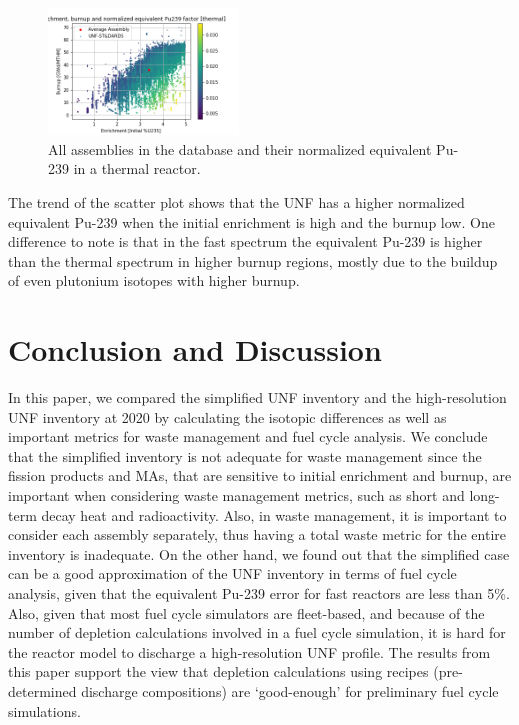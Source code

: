 \documentclass{anstrans}
\begin{document}
\begin{figure}
    \centering
    \includegraphics[width=0.45\textwidth]{./images/thermal_all.png}
    \caption{All assemblies in the database and their normalized equivalent Pu-239 in a thermal reactor.}
    \label{fig:thermal_all}
\end{figure}

The trend of the scatter plot shows that the \gls{UNF}
has a higher normalized equivalent Pu-239 when the
initial enrichment is high and the burnup low. One difference
to note is that in the fast spectrum the equivalent Pu-239
is higher than the thermal spectrum in higher burnup regions,
mostly due to the buildup of even plutonium isotopes with
higher burnup.

\section{Conclusion and Discussion}
In this paper, we compared the simplified \gls{UNF}
inventory and the high-resolution \gls{UNF} inventory
at 2020 by calculating the isotopic differences as well
as important metrics for waste management and fuel cycle analysis.
We conclude that the simplified inventory is not adequate for waste
management since the fission products and \glspl{MA}, that are sensitive to 
initial enrichment and burnup, are important when considering
waste management metrics, such as short and long-term decay heat and radioactivity.
Also, in waste management, it is important to consider each assembly separately,
thus having a total waste metric for the entire inventory is inadequate.
On the other hand, we found out that the simplified case can be a good
approximation of the \gls{UNF} inventory in terms of fuel cycle analysis,
given that the equivalent Pu-239 error for fast reactors are less than
5\%. Also, given that most fuel cycle simulators are fleet-based, and
because of the number of depletion calculations involved in a fuel cycle
simulation, it is hard for the reactor model to discharge a high-resolution \gls{UNF} profile.
The results from this paper support the view that depletion calculations
using recipes (pre-determined discharge compositions) are `good-enough' for preliminary fuel cycle simulations.
\end{document}
